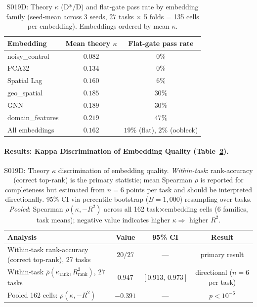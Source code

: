 \documentclass{article}
\begin{document}
\begin{table}[htbp]
\centering
\small
\caption{S019D: Theory $\kappa$ (D*/D) and flat-gate pass rate by embedding family (seed-mean across 3 seeds, 27 tasks $\times$ 5 folds = 135 cells per embedding). Embeddings ordered by mean $\kappa$.}
\label{tab:s019d_summary}
\begin{tabular}{l|cc}
\toprule
\textbf{Embedding} & \textbf{Mean theory $\kappa$} & \textbf{Flat-gate pass rate} \\
\midrule
noisy\_control    & $0.082$ & $0\%$ \\
PCA32             & $0.134$ & $0\%$ \\
Spatial Lag       & $0.160$ & $6\%$ \\
geo\_spatial      & $0.185$ & $30\%$ \\
GNN               & $0.189$ & $30\%$ \\
domain\_features  & $0.219$ & $47\%$ \\
\midrule
All embeddings    & $0.162$ & $19\%$ (flat), $2\%$ (oobleck) \\
\bottomrule
\end{tabular}
\end{table}

\paragraph{Results: Kappa Discrimination of Embedding Quality (Table~\ref{tab:s019d_kappa_corr}).}

\begin{table}[htbp]
\centering
\small
\caption{S019D: Theory $\kappa$ discrimination of embedding quality. \emph{Within-task}: rank-accuracy (correct top-rank) is the primary statistic; mean Spearman $\rho$ is reported for completeness but estimated from $n{=}6$ points per task and should be interpreted directionally. 95\% CI via percentile bootstrap ($B{=}1{,}000$) resampling over tasks. \emph{Pooled}: Spearman $\rho(\kappa, -R^2)$ across all 162 task$\times$embedding cells (6 families, task means); negative value indicates higher $\kappa \Rightarrow$ higher $R^2$.}
\label{tab:s019d_kappa_corr}
\begin{tabular}{l|ccc}
\toprule
\textbf{Analysis} & \textbf{Value} & \textbf{95\% CI} & \textbf{Result} \\
\midrule
Within-task rank-accuracy (correct top-rank), 27 tasks & $20/27$ & --- & primary result \\
Within-task $\bar\rho(\kappa_{\text{rank}}, R^2_{\text{rank}})$, 27 tasks & $0.947$ & $[0.913,\, 0.973]$ & directional ($n{=}6$ per task) \\
Pooled 162 cells: $\rho(\kappa, -R^2)$ & $-0.391$ & --- & $p < 10^{-6}$ \\
\bottomrule
\end{tabular}
\end{table}
\end{document}

